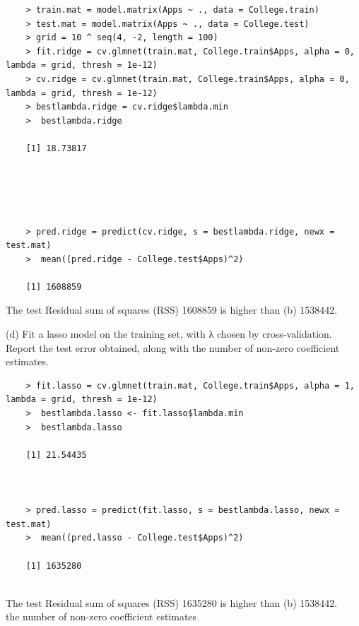 \documentclass{article}
\begin{document}
\newpage


\begin{program}
	\begin{verbatim}
	> train.mat = model.matrix(Apps ~ ., data = College.train)
	> test.mat = model.matrix(Apps ~ ., data = College.test)
	> grid = 10 ^ seq(4, -2, length = 100)
	> fit.ridge = cv.glmnet(train.mat, College.train$Apps, alpha = 0, lambda = grid, thresh = 1e-12)
	> cv.ridge = cv.glmnet(train.mat, College.train$Apps, alpha = 0, lambda = grid, thresh = 1e-12)
	> bestlambda.ridge = cv.ridge$lambda.min
	>  bestlambda.ridge
	
	[1] 18.73817	
	
	
	
	
	
	> pred.ridge = predict(cv.ridge, s = bestlambda.ridge, newx = test.mat)
	>  mean((pred.ridge - College.test$Apps)^2)

	[1] 1608859
	\end{verbatim}
\end{program}
The test Residual sum of squares (RSS) 1608859  is higher than (b) 1538442.

\newpage
(d) Fit a lasso model on the training set, with λ chosen by cross-validation. Report the test error obtained, along with the number of non-zero coefficient estimates.\\

\begin{program}
	\begin{verbatim}
	> fit.lasso = cv.glmnet(train.mat, College.train$Apps, alpha = 1, lambda = grid, thresh = 1e-12)
	>  bestlambda.lasso <- fit.lasso$lambda.min
	>  bestlambda.lasso
	
	[1] 21.54435
	
	
	
	> pred.lasso = predict(fit.lasso, s = bestlambda.lasso, newx = test.mat)
	>  mean((pred.lasso - College.test$Apps)^2)
	
	[1] 1635280
	
	\end{verbatim}
\end{program}
The test Residual sum of squares (RSS) 1635280  is higher than (b) 1538442.\\

the number of non-zero coefficient estimates
\end{document}
